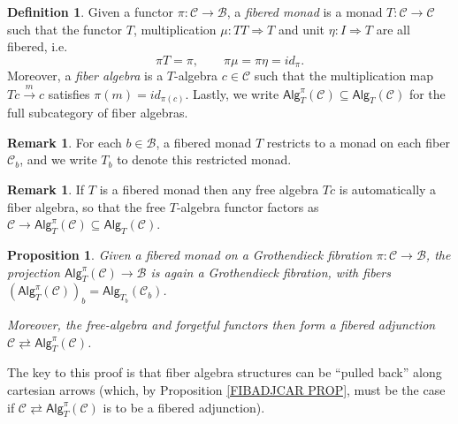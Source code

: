 \documentclass[a4paper,10pt
,draft
]{article}%
\numberwithin{equation}{section}
\numberwithin{figure}{section}
\newtheorem{proposition}[equation]{Proposition}%
\theoremstyle{definition} %
\newtheorem{definition}[equation]{Definition}%
\newtheorem{remark}[equation]{Remark}%
\newcommand{\1}{\ensuremath{\mathbbm 1}}%
\begin{document}
\begin{definition}\label{FIBMON DEF}
	Given a functor $\pi \colon \mathcal{C} \to \mathcal{B}$,
	a \textit{fibered monad} is a monad $T \colon \mathcal{C} \to \mathcal{C}$ such that 
	the functor $T$,
	multiplication 
	$\mu \colon TT \Rightarrow T$
	and unit $\eta \colon I \Rightarrow T$
	are all fibered, i.e.
	\[
	\pi T = \pi,\qquad
	\pi\mu=\pi\eta=id_{\pi}.
	\]
	Moreover, a \textit{fiber algebra} is a $T$-algebra $c \in \mathcal{C}$
	such that the multiplication map
	$Tc \xrightarrow{m} c$ satisfies 
	$\pi(m)=id_{\pi(c)}$.
	Lastly, we write $\mathsf{Alg}^{\pi}_T(\mathcal{C}) \subseteq \mathsf{Alg}_T(\mathcal{C})$ for the full subcategory of fiber algebras.
\end{definition}


\begin{remark}
        \label{MONFIB_REM}
	For each $b\in \mathcal{B}$, a fibered monad $T$ restricts to a monad on each fiber $\mathcal{C}_b$, and we write $T_b$ to denote this restricted monad.
\end{remark}


\begin{remark}
	If $T$ is a fibered monad then any free algebra $Tc$ is automatically a fiber algebra, so that the free $T$-algebra functor factors
	as 
	$\mathcal{C} \to \mathsf{Alg}^{\pi}_T(\mathcal{C}) \subseteq \mathsf{Alg}_T(\mathcal{C})$.
\end{remark}



\begin{proposition}\label{FIBALGGR PROP}
	Given a fibered monad on a Grothendieck fibration $\pi \colon \mathcal{C} \to \mathcal{B}$,
	the projection $\mathsf{Alg}^{\pi}_T(\mathcal{C}) \to \mathcal{B}$
	is again a Grothendieck fibration, with fibers
	$\left(\mathsf{Alg}^{\pi}_T(\mathcal C)\right)_b = \mathsf{Alg}_{T_b}(\mathcal C_b)$.
	
	Moreover, the free-algebra and forgetful functors then form a fibered adjunction
	$\mathcal{C} \rightleftarrows \mathsf{Alg}^{\pi}_T(\mathcal{C})$.
\end{proposition}


The key to this proof is that fiber algebra structures can be ``pulled back'' along cartesian arrows
(which, by Proposition \ref{FIBADJCAR PROP}, must be the case if $\mathcal{C} \rightleftarrows \mathsf{Alg}^{\pi}_T(\mathcal{C})$ is to be a fibered adjunction). 
\end{document}
